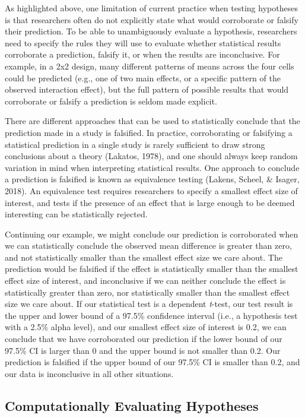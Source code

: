 \documentclass[
  english,
  doc,floatsintext]{apa6}
\begin{document}
As highlighted above, one limitation of current practice when testing hypotheses is that researchers often do not explicitly state what would corroborate or falsify their prediction. To be able to unambiguously evaluate a hypothesis, researchers need to specify the rules they will use to evaluate whether statistical results corroborate a prediction, falsify it, or when the results are inconclusive. For example, in a 2x2 design, many different patterns of means across the four cells could be predicted (e.g., one of two main effects, or a specific pattern of the observed interaction effect), but the full pattern of possible results that would corroborate or falsify a prediction is seldom made explicit.

There are different approaches that can be used to statistically conclude that the prediction made in a study is falsified. In practice, corroborating or falsifying a statistical prediction in a single study is rarely sufficient to draw strong conclusions about a theory (Lakatos, 1978), and one should always keep random variation in mind when interpreting statistical results. One approach to conclude a prediction is falsified is known as equivalence testing (Lakens, Scheel, \& Isager, 2018). An equivalence test requires researchers to specify a smallest effect size of interest, and tests if the presence of an effect that is large enough to be deemed interesting can be statistically rejected.

Continuing our example, we might conclude our prediction is corroborated when we can statistically conclude the observed mean difference is greater than zero, and not statistically smaller than the smallest effect size we care about. The prediction would be falsified if the effect is statistically smaller than the smallest effect size of interest, and inconclusive if we can neither conclude the effect is statistically greater than zero, nor statistically smaller than the smallest effect size we care about. If our statistical test is a dependent \emph{t}-test, our test result is the upper and lower bound of a 97.5\% confidence interval (i.e., a hypothesis test with a 2.5\% alpha level), and our smallest effect size of interest is 0.2, we can conclude that we have corroborated our prediction if the lower bound of our 97.5\% CI is larger than 0 and the upper bound is not smaller than 0.2. Our prediction is falsified if the upper bound of our 97.5\% CI is smaller than 0.2, and our data is inconclusive in all other situations.

\hypertarget{computationally-evaluating-hypotheses}{%
\subsection{Computationally Evaluating Hypotheses}\label{computationally-evaluating-hypotheses}}
\end{document}
